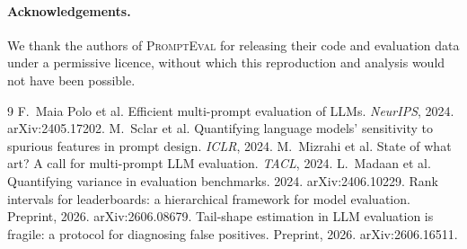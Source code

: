 \documentclass[11pt]{article}
\newcommand{\pe}{\textsc{PromptEval}}
\begin{document}
\paragraph{Acknowledgements.} We thank the authors of \pe{} \citep{polo2024prompteval} for
releasing their code and evaluation data under a permissive licence, without which this
reproduction and analysis would not have been possible.

\small

\begin{thebibliography}{9}
 F.~Maia Polo et al.
\newblock Efficient multi-prompt evaluation of LLMs. \emph{NeurIPS}, 2024. arXiv:2405.17202.
 M.~Sclar et al.
\newblock Quantifying language models' sensitivity to spurious features in prompt design. \emph{ICLR}, 2024.
 M.~Mizrahi et al.
\newblock State of what art? A call for multi-prompt LLM evaluation. \emph{TACL}, 2024.
 L.~Madaan et al.
\newblock Quantifying variance in evaluation benchmarks. 2024. arXiv:2406.10229.
 Rank intervals for leaderboards: a hierarchical framework for model evaluation. Preprint, 2026. arXiv:2606.08679.
 Tail-shape estimation in LLM evaluation is fragile: a protocol for diagnosing false positives. Preprint, 2026. arXiv:2606.16511.
\end{thebibliography}
\end{document}
